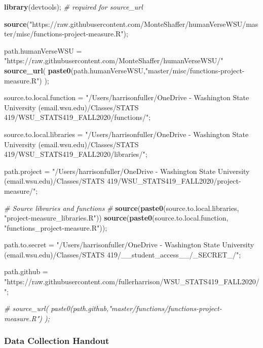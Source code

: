 \documentclass[]{article}
\newenvironment{Shaded}{\begin{snugshade}}{\end{snugshade}}
\newcommand{\CommentTok}[1]{\textcolor[rgb]{0.56,0.35,0.01}{\textit{#1}}}
\newcommand{\KeywordTok}[1]{\textcolor[rgb]{0.13,0.29,0.53}{\textbf{#1}}}
\newcommand{\NormalTok}[1]{#1}
\newcommand{\StringTok}[1]{\textcolor[rgb]{0.31,0.60,0.02}{#1}}
\begin{document}
\begin{Shaded}
\begin{Highlighting}[]
\KeywordTok{library}\NormalTok{(devtools);       }\CommentTok{# required for source_url}


\KeywordTok{source}\NormalTok{(}\StringTok{"https://raw.githubusercontent.com/MonteShaffer/humanVerseWSU/master/misc/functions-project-measure.R"}\NormalTok{);}

\NormalTok{path.humanVerseWSU =}\StringTok{ "https://raw.githubusercontent.com/MonteShaffer/humanVerseWSU/"}
\KeywordTok{source_url}\NormalTok{( }\KeywordTok{paste0}\NormalTok{(path.humanVerseWSU,}\StringTok{"master/misc/functions-project-measure.R"}\NormalTok{) );}

\NormalTok{source.to.local.function =}\StringTok{  "/Users/harrisonfuller/OneDrive - Washington State University (email.wsu.edu)/Classes/STATS 419/WSU_STATS419_FALL2020/functions/"}\NormalTok{;}

\NormalTok{source.to.local.libraries =}\StringTok{ "/Users/harrisonfuller/OneDrive - Washington State University (email.wsu.edu)/Classes/STATS 419/WSU_STATS419_FALL2020/libraries/"}\NormalTok{;}

\NormalTok{path.project =}\StringTok{ "/Users/harrisonfuller/OneDrive - Washington State University (email.wsu.edu)/Classes/STATS 419/WSU_STATS419_FALL2020/project-measure/"}\NormalTok{;}

\CommentTok{# Source libraries and functions}
\CommentTok{# }
\KeywordTok{source}\NormalTok{(}\KeywordTok{paste0}\NormalTok{(source.to.local.libraries, }\StringTok{"project-measure_libraries.R"}\NormalTok{))}
\KeywordTok{source}\NormalTok{(}\KeywordTok{paste0}\NormalTok{(source.to.local.function, }\StringTok{"functions_project-measure.R"}\NormalTok{));}


\NormalTok{path.to.secret =}\StringTok{ "/Users/harrisonfuller/OneDrive - Washington State University (email.wsu.edu)/Classes/STATS 419/__student_access__/_SECRET_/"}\NormalTok{;}


\NormalTok{path.github =}\StringTok{ "https://raw.githubusercontent.com/fullerharrison/WSU_STATS419_FALL2020/"}\NormalTok{;}

\CommentTok{# source_url( paste0(path.github,"master/functions/functions-project-measure.R") );}
\end{Highlighting}
\end{Shaded}

\newpage

\subsubsection{Data Collection Handout}
\label{sec:appendix-data-handout}
\end{document}

